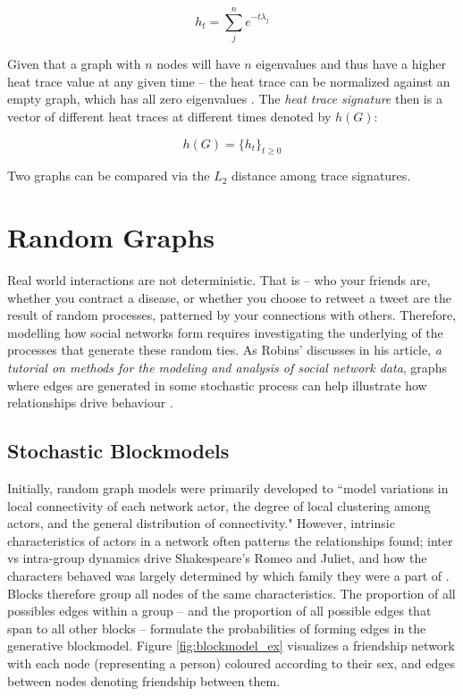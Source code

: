 \begin{equation}\label{equation:heat_trace}
    h_{t}=\sum_{j}^{n}e^{-t\lambda_{j}}
\end{equation}
 
Given that a graph with $n$ nodes will have $n$ eigenvalues and thus have a
higher heat trace value at any given time -- the heat trace can be normalized
against an empty graph, which has all zero eigenvalues \cite{netlsd}. The
\emph{heat trace signature} then is a vector of different heat traces at
different times denoted by $h(G)$:

\begin{equation}\label{equation:heat_trace_sig}
    h(G) = \{h_{t}\}_{t\geq0}
\end{equation}

Two graphs can be compared via the $L_{2}$ distance among trace signatures.

\section{Random Graphs}\label{sec:RandomGraphs}
    
Real world interactions are not deterministic. That is -- who your friends are,
whether you contract a disease, or whether you choose to retweet a tweet are the
result of random processes, patterned by your connections with others.
Therefore, modelling how social networks form requires investigating the
underlying of the processes that generate these random ties. As Robins'
discusses in his article,\emph{ a tutorial on methods for the modeling and
analysis of social network data}, graphs where edges are generated in some
stochastic process can help illustrate how relationships drive behaviour
\cite{robins2013tutorial}.  

\subsection{Stochastic Blockmodels}\label{sec:SBM}

Initially, random graph models were primarily developed to ``model  variations in
local connectivity of each network actor, the degree of local clustering among
actors, and the general distribution of connectivity." \cite{robins2013tutorial}
However, intrinsic characteristics of actors in a network often patterns the
relationships found; inter vs intra-group dynamics drive Shakespeare's Romeo and
Juliet, and how the characters behaved was largely determined by which family
they were a part of \cite{doreian2005generalized}. Blocks therefore group all
nodes of the same characteristics. The proportion of all possibles edges within
a group -- and the proportion of all possible edges that span to all other
blocks -- formulate the probabilities of forming edges in the generative
blockmodel. Figure \ref{fig:blockmodel_ex} visualizes a friendship network with
each node (representing a person) coloured according to their sex, and edges
between nodes denoting friendship between them.

